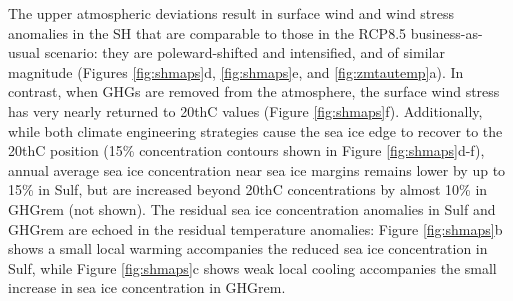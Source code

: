 \documentclass[draft,grl]{AGUTeX}  %
\begin{document}
\begin{article}
The upper atmospheric deviations result in surface wind and wind stress anomalies in the SH that are comparable to those in the RCP8.5 business-as-usual scenario: they are poleward-shifted and intensified, and of similar magnitude (Figures \ref{fig:shmaps}d, \ref{fig:shmaps}e, and \ref{fig:zmtautemp}a). In contrast, when GHGs are removed from the atmosphere, the surface wind stress has very nearly returned to 20thC values (Figure \ref{fig:shmaps}f). Additionally, while both climate engineering strategies cause the sea ice edge to recover to the 20thC position (15\% concentration contours shown in Figure \ref{fig:shmaps}d-f), annual average sea ice concentration near sea ice margins remains lower by up to 15\% in Sulf, but are increased beyond 20thC concentrations by almost 10\% in GHGrem (not shown). The residual sea ice concentration anomalies in Sulf and GHGrem are echoed in the residual temperature anomalies: Figure \ref{fig:shmaps}b shows a small local warming accompanies the reduced sea ice concentration in Sulf, while Figure \ref{fig:shmaps}c shows weak local cooling accompanies the small increase in sea ice concentration in  GHGrem. %


\end{article}
\end{document}

